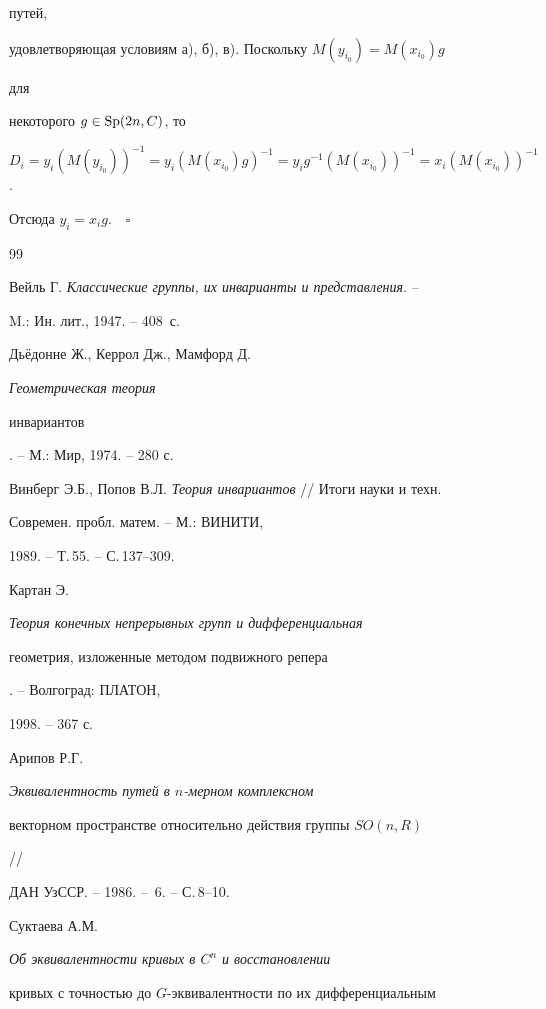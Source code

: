 путей, 


удовлетворяющая условиям а), б), в). Поскольку $M(y_{i_0})=M(x_{i_0})g$ 


для


некоторого $g\in \operatorname{Sp}(2n,C)$, то 


$D_i=y_i(M(y_{i_0}))^{-1}= y_i(M(x_{i_0})g)^{-1}= y_i 


g^{-1}(M(x_{i_0}))^{-1}=x_i(M(x_{i_0}))^{-1}$.


Отсюда $y_i=x_i g$.$\quad\square$








\begin{thebibliography}{99}







Вейль Г. {\em Классические группы, их инварианты и представления}. -- 


M.: Ин. лит., 1947. -- 408~с.




Дь\"едонне Ж., Керрол Дж., Мамфорд Д. {\em Геометрическая теория 


инвариантов}. -- М.: Мир, 1974. -- 280 с.




Винберг Э.Б., Попов В.Л. {\em Теория инвариантов} // Итоги науки и техн. 


Современ. пробл. матем. -- М.: ВИНИТИ, 


1989. -- Т.\,55. -- С.\,137--309.




Картан Э. {\em Теория конечных непрерывных групп и дифференциальная 


геометрия, изложенные методом подвижного репера}. -- Волгоград: ПЛАТОН,


1998. -- 367 с.




Арипов Р.Г. {\em Эквивалентность путей в $n$-мерном комплексном 


векторном пространстве относительно действия группы $SO(n,R)$} //


ДАН УзССР. -- 1986. -- \No\,6. -- С.\,8--10.




Суктаева А.М. {\em Об эквивалентности кривых в $C^n$ и восстановлении


кривых с точностью до $G$-эквивалентности по их дифференциальным 


}
\end{thebibliography}
